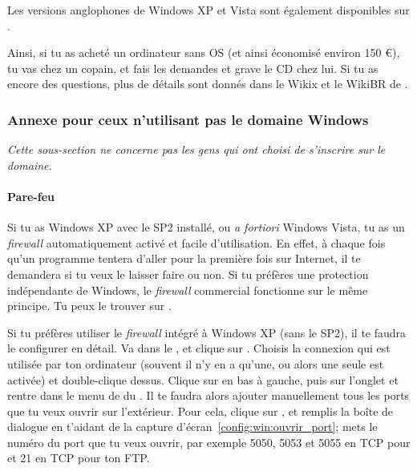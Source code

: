 Les versions anglophones de Windows XP et Vista sont \'egalement disponibles sur .

Ainsi, si tu as achet\'e un ordinateur sans OS (et ainsi \'economis\'e environ 150 \euro), tu vas chez un copain, et fais les demandes et grave le CD chez lui. Si tu as encore des questions, plus de d\'etails sont donn\'es dans le Wikix et le WikiBR de \fkz.


\subsubsection{Annexe pour ceux n'utilisant pas le domaine Windows}

\label{horsdomaine} \emph{Cette sous-section ne concerne pas les gens qui ont choisi de s'inscrire sur le domaine.}

\paragraph{Pare-feu} Si tu as Windows XP avec le SP2 install\'e, ou \emph{a fortiori}
Windows Vista, tu as un \emph{firewall} automatiquement activ\'e et facile d'utilisation. En effet, \`a chaque fois qu'un programme tentera d'aller pour
la premi\`ere fois sur Internet, il te demandera si tu veux le laisser faire ou non. Si tu pr\'ef\`eres une protection ind\'ependante de Windows, le
\emph{firewall} commercial  fonctionne sur le m\^eme principe. Tu peux le trouver sur \xshare.

Si tu pr\'ef\`eres utiliser le \emph{firewall} int\'egr\'e \`a Windows XP (sans le SP2), il te faudra le configurer en d\'etail. Va dans le ,
 et clique sur . Choisis la connexion qui est utilis\'ee par ton ordinateur (souvent il n'y en a qu'une, ou
alors une seule est activ\'ee) et double-clique dessus. Clique sur  en bas \`a gauche, puis sur l'onglet  et rentre dans le
menu de  du . Il te faudra alors ajouter manuellement tous les ports que tu veux ouvrir sur l'ext\'erieur. Pour
cela, clique sur , et remplis la bo\^ite de dialogue en t'aidant de la capture d'\'ecran~\ref{config:win:ouvrir_port}; mets le num\'ero du
port que tu veux ouvrir, par exemple 5050, 5053 et 5055 en TCP pour  et 21 en TCP pour ton FTP.


